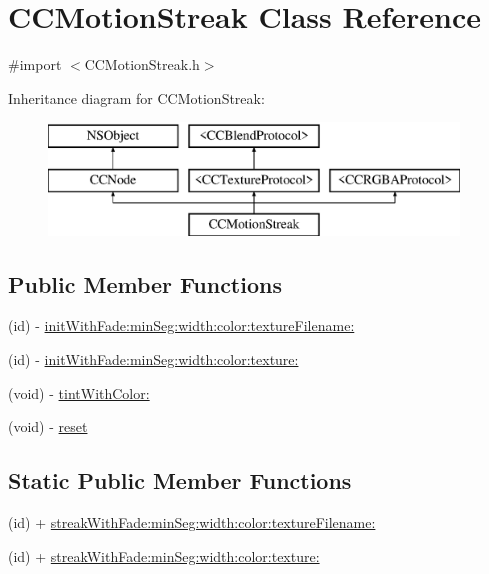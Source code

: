 \hypertarget{interface_c_c_motion_streak}{\section{C\-C\-Motion\-Streak Class Reference}
\label{interface_c_c_motion_streak}
}


{\ttfamily \#import $<$C\-C\-Motion\-Streak.\-h$>$}

Inheritance diagram for C\-C\-Motion\-Streak\-:\begin{figure}[H]
\begin{center}
\leavevmode
\includegraphics[height=3.000000cm]{interface_c_c_motion_streak}
\end{center}
\end{figure}
\subsection*{Public Member Functions}
\begin{DoxyCompactItemize}
\item 
(id) -\/ \hyperlink{interface_c_c_motion_streak_aa658d1dfa722a3d8ef658642373ebe22}{init\-With\-Fade\-:min\-Seg\-:width\-:color\-:texture\-Filename\-:}
\item 
(id) -\/ \hyperlink{interface_c_c_motion_streak_afb55337ec2cd41c7d06bbf506adbeddc}{init\-With\-Fade\-:min\-Seg\-:width\-:color\-:texture\-:}
\item 
(void) -\/ \hyperlink{interface_c_c_motion_streak_a363533a58da3fd731617f31aa952bb16}{tint\-With\-Color\-:}
\item 
(void) -\/ \hyperlink{interface_c_c_motion_streak_a5a1a9784ab58af1e78316faa04d3288f}{reset}
\end{DoxyCompactItemize}
\subsection*{Static Public Member Functions}
\begin{DoxyCompactItemize}
\item 
(id) + \hyperlink{interface_c_c_motion_streak_a74bb165593c5a4a1802ab3fe19c14a0b}{streak\-With\-Fade\-:min\-Seg\-:width\-:color\-:texture\-Filename\-:}
\item 
(id) + \hyperlink{interface_c_c_motion_streak_a5715594cc333622f845a4b5506726a37}{streak\-With\-Fade\-:min\-Seg\-:width\-:color\-:texture\-:}
\end{DoxyCompactItemize}

